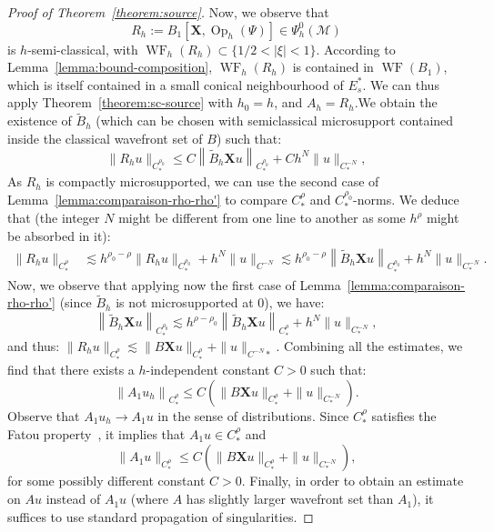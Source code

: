 \documentclass[AHL,Unicode,longabstracts,published]{cedram}
\newcommand{\X}{\mathbf{X}}
\newcommand{\M}{\mathcal{M}}
\DeclareMathOperator{\Op}{Op}
\DeclareMathOperator{\WF}{WF}
\begin{document}
\begin{proof}[Proof of Theorem~\ref{theorem:source}]
Now, we observe that
\[
R_{h}:=B_1\left[\X, \Op_{h}(\Psi)\right] \in \Psi^0_{h}(\M)
\]
is $h$-semi-classical, with $\WF_{h}(R_{h}) \subset\{1/2 < |\xi| < 1\}$. According to Lemma~\ref{lemma:bound-composition}, $\WF_h(R_h)$ is contained in $\WF(B_1)$, which is itself contained in a small conical neighbourhood of $E^\ast_s$. We can thus apply Theorem~\ref{theorem:sc-source} with $h_0 = h$, and $A_h = R_h$.\linebreak We obtain the existence of $\widetilde{B}_{h}$ (which can be chosen with semiclassical microsupport contained inside the classical wavefront set of $B$) such that:
\[
\|R_{h}u \|_{C^{\rho_0}_\ast} \leq C \left\| \widetilde{B}_{h} \X u \right\|_{C^{\rho_0}_\ast} + C h^N \|u\|_{C^{-N}_*},
\]
As $R_{h}$ is compactly microsupported, we can use the second case of Lemma~\ref{lemma:comparaison-rho-rho'} to compare $C^\rho_*$ and $C^{\rho_0}_*$-norms. We deduce that (the integer $N$ might be different from one line to another as some $h^\rho$ might be absorbed in it):
\begin{align*}
\|R_{h} u\|_{C^\rho_*} & \lesssim h^{\rho_0-\rho} \|R_{h}u \|_{C^{\rho_0}_*} + h^N\|u\|_{C^{-N}} \lesssim h^{\rho_0-\rho} \left\| \widetilde{B}_{h} \X u \right\|_{C^{\rho_0}_\ast} + h^N \|u\|_{C^{-N}_*}.
\end{align*}
Now, we observe that applying now the first case of Lemma~\ref{lemma:comparaison-rho-rho'} (since $\widetilde{B}_h$ is not microsupported at $0$), we have:
\[
\left\|\widetilde{B}_{h} \X u \right\|_{C^{\rho_0}_\ast} \lesssim h^{\rho-\rho_0} \left\|\widetilde{B}_{h} \X u \right\|_{C^{\rho}_\ast} + h^N \|u\|_{C^{-N}_*},
\]
and thus: $\|R_{h} u\|_{C^\rho_*} \lesssim \|B \X u \|_{C^\rho_*} + \|u\|_{C^{-N}*}$. Combining all the estimates, we find that there exists a $h$-independent constant $C > 0$ such that:
\begin{equation}\label{equation:a1}
\left\|A_1 u_{h} \right\|_{C^{\rho}_\ast} \leq C \left(\|B \X u\|_{C^\rho_*} + \|u\|_{C^{-N}_*}\right).
\end{equation}
Observe that $A_1 u_h \rightarrow A_1 u$ in the sense of distributions. Since $C^\rho_\ast$ satisfies the Fatou property~\cite[Proposition~2, p.~15]{Runst-Sickel-96}, it implies that $A_1 u \in C^\rho_\ast$ and
\[
\|A_1 u\|_{C^{\rho}_\ast} \leq C \left(\|B \X u\|_{C^\rho_*} + \|u\|_{C^{-N}_*}\right),
\]
for some possibly different constant $C > 0$. Finally, in order to obtain an estimate on $Au$ instead of $A_1 u$ (where $A$ has slightly larger wavefront set than $A_1$), it suffices to use standard propagation of singularities.
\end{proof}
\end{document}
